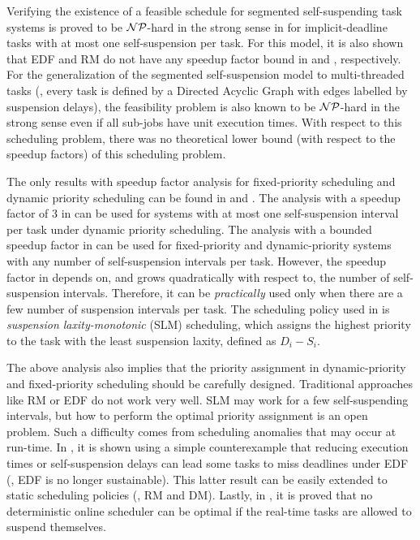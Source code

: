 Verifying the existence of a feasible schedule for segmented self-suspending task systems is proved to be ${\cal NP}$-hard in the strong sense in \cite{Ridouard_2004} for implicit-deadline tasks with at most one self-suspension per task. For this model, it is also shown that EDF and RM do not have any speedup factor bound in \cite{Ridouard_2004} and \cite{RTSS-ChenL14}, respectively. For the generalization of the segmented self-suspension model to multi-threaded tasks (\ie, every task is defined by a Directed Acyclic Graph with edges labelled by suspension delays), the feasibility problem is also known to be  ${\cal NP}$-hard in the strong sense  \cite{Ric03} even if all sub-jobs have unit execution times. With respect to this scheduling problem, there was no theoretical lower bound (with respect to the speedup factors) of this scheduling problem. 

 The only results with speedup factor analysis for fixed-priority scheduling and dynamic priority scheduling can be found in \cite{RTSS-ChenL14} and \cite{WC16-suspend-DATE}. The analysis with a speedup factor of $3$ in \cite{RTSS-ChenL14} can be used for systems with at most one self-suspension interval per task under dynamic priority scheduling. The analysis with a bounded speedup factor in \cite{WC16-suspend-DATE} can be used for fixed-priority and dynamic-priority systems with any number of self-suspension intervals per task. However, the speedup factor in \cite{WC16-suspend-DATE} depends on, and grows quadratically with respect to, the number of self-suspension intervals. Therefore, it can be \emph{practically} used only  when there are  a few number of suspension intervals per task. The scheduling policy used in \cite{WC16-suspend-DATE} is \emph{suspension laxity-monotonic} (SLM) scheduling, which assigns the highest priority to the task with the least suspension laxity, defined as $D_i-S_i$.


The above analysis also implies that the priority assignment in dynamic-priority and fixed-priority scheduling should be carefully designed. Traditional approaches like RM or EDF do not work very well. SLM may work for a few self-suspending intervals, but how to perform the optimal priority assignment is an open problem. Such a difficulty comes from scheduling anomalies that may occur at run-time. In \cite{Ridouard_2004}, it is shown using a simple counterexample that reducing execution times or self-suspension delays can lead some tasks to miss deadlines under EDF (\ie, EDF is no longer sustainable). This latter result can be easily extended to static scheduling policies (\ie, RM and DM). Lastly, in \cite{RidouardR06}, it is proved that no deterministic online scheduler can be optimal if the real-time tasks are allowed to suspend themselves.



